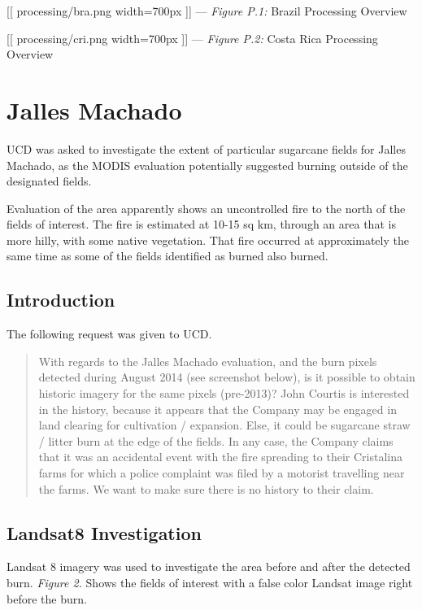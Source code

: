 \documentclass[]{article}
\begin{document}
{[}{[} processing/bra.png \textbar{} width=700px {]}{]} \textbar{} ---
\textbar{} \emph{Figure P.1:} Brazil Processing Overview \textbar{}

{[}{[} processing/cri.png \textbar{} width=700px {]}{]} \textbar{} ---
\textbar{} \emph{Figure P.2:} Costa Rica Processing Overview \textbar{}

\section{Jalles Machado}\label{jalles-machado}

UCD was asked to investigate the extent of particular sugarcane fields
for Jalles Machado, as the MODIS evaluation potentially suggested
burning outside of the designated fields.

Evaluation of the area apparently shows an uncontrolled fire to the
north of the fields of interest. The fire is estimated at 10-15 sq km,
through an area that is more hilly, with some native vegetation. That
fire occurred at approximately the same time as some of the fields
identified as burned also burned.

\subsection{Introduction}\label{introduction}

The following request was given to UCD.

\begin{quote}
With regards to the Jalles Machado evaluation, and the burn pixels
detected during August 2014 (see screenshot below), is it possible to
obtain historic imagery for the same pixels (pre-2013)? John Courtis is
interested in the history, because it appears that the Company may be
engaged in land clearing for cultivation / expansion. Else, it could be
sugarcane straw / litter burn at the edge of the fields. In any case,
the Company claims that it was an accidental event with the fire
spreading to their Cristalina farms for which a police complaint was
filed by a motorist travelling near the farms. We want to make sure
there is no history to their claim.
\end{quote}

\subsection{Landsat8 Investigation}\label{landsat8-investigation}

Landsat 8 imagery was used to investigate the area before and after the
detected burn. \emph{Figure 2.} Shows the fields of interest with a
false color Landsat image right before the burn.
\end{document}
